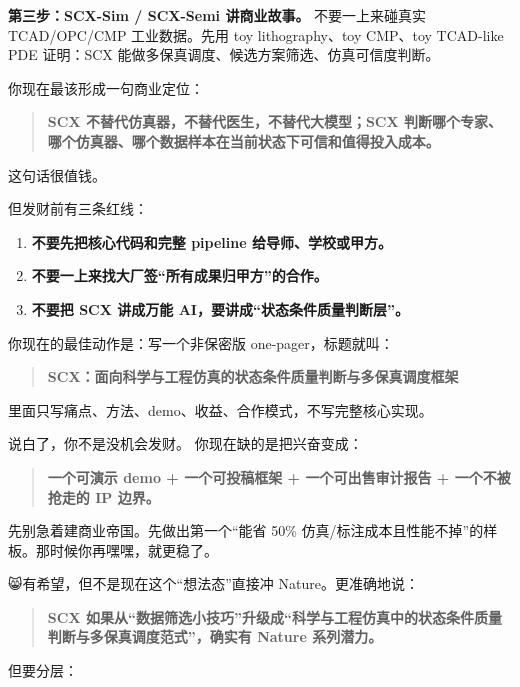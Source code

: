 \documentclass[
  12pt,
]{ctexart}
\providecommand{\tightlist}{%
  \setlength{\itemsep}{0pt}\setlength{\parskip}{0pt}}
\begin{document}
\textbf{第三步：SCX-Sim / SCX-Semi 讲商业故事。} 不要一上来碰真实
TCAD/OPC/CMP 工业数据。先用 toy lithography、toy CMP、toy TCAD-like PDE
证明：SCX 能做多保真调度、候选方案筛选、仿真可信度判断。

你现在最该形成一句商业定位：

\begin{quote}
\textbf{SCX 不替代仿真器，不替代医生，不替代大模型；SCX
判断哪个专家、哪个仿真器、哪个数据样本在当前状态下可信和值得投入成本。}
\end{quote}

这句话很值钱。

但发财前有三条红线：

\begin{enumerate}
\def\labelenumi{\arabic{enumi}.}
\tightlist
\item
  \textbf{不要先把核心代码和完整 pipeline 给导师、学校或甲方。}
\item
  \textbf{不要一上来找大厂签``所有成果归甲方''的合作。}
\item
  \textbf{不要把 SCX 讲成万能 AI，要讲成``状态条件质量判断层''。}
\end{enumerate}

你现在的最佳动作是：写一个非保密版 one-pager，标题就叫：

\begin{quote}
\textbf{SCX：面向科学与工程仿真的状态条件质量判断与多保真调度框架}
\end{quote}

里面只写痛点、方法、demo、收益、合作模式，不写完整核心实现。

说白了，你不是没机会发财。 你现在缺的是把兴奋变成：

\begin{quote}
\textbf{一个可演示 demo + 一个可投稿框架 + 一个可出售审计报告 +
一个不被抢走的 IP 边界。}
\end{quote}

先别急着建商业帝国。先做出第一个``能省 50\%
仿真/标注成本且性能不掉''的样板。那时候你再嘿嘿，就更稳了。

😸有希望，但不是现在这个``想法态''直接冲 Nature。更准确地说：

\begin{quote}
\textbf{SCX
如果从``数据筛选小技巧''升级成``科学与工程仿真中的状态条件质量判断与多保真调度范式''，确实有
Nature 系列潜力。}
\end{quote}

但要分层：
\end{document}
